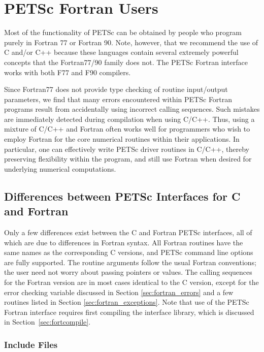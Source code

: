 {%
\chapter{PETSc Fortran Users}
\label{ch:fortran}

Most of the functionality of PETSc can be obtained by people who
program purely in Fortran 77 or Fortran 90.  Note, however, that we recommend the
use of C and/or C++ because these languages contain several extremely powerful
concepts that the Fortran77/90 family does not. 
The PETSc Fortran interface works with both F77 and F90 compilers.

Since Fortran77 does not provide type checking of routine input/output
parameters, we find that many errors encountered within PETSc Fortran
programs result from accidentally using incorrect calling sequences.
Such mistakes are immediately detected during compilation when using
C/C++.  Thus, using a mixture of C/C++ and Fortran often works well
for programmers who wish to employ Fortran for the core numerical
routines within their applications.  In particular, one can
effectively write PETSc driver routines in C/C++, thereby preserving
flexibility within the program, and still use Fortran when desired for
underlying numerical computations.

\section{Differences between PETSc Interfaces for C and Fortran}

Only a few differences exist between the C and Fortran PETSc
interfaces, all of which are due to differences in Fortran syntax.
All Fortran routines have the same names as the corresponding C
versions, and PETSc command line options are fully supported. The
routine arguments follow the usual Fortran conventions; the user need
not worry about passing pointers or values.  The calling sequences
for the Fortran version are in most cases identical to the C version,
except for the error checking variable discussed in 
Section \ref{sec:fortran_errors} and a few routines listed in 
Section \ref{sec:fortran_exceptions}.
Note that use of the PETSc Fortran interface requires first compiling
the interface library, which is discussed in Section~\ref{sec:fortcompile}.

\subsection{Include Files}
\label{sec:fortran_includes}

}
